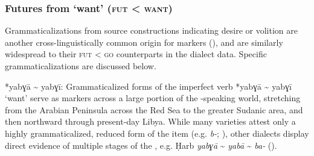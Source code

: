 \documentclass[output=paper]{langsci/langscibook}
\begin{document}
\subsubsection{Futures from ‘want’ (\textsc{fut} < \textsc{want})}

Grammaticalizations from source constructions indicating desire or volition are another cross-linguistically common origin for   markers (\citealt{Bybee1994,HeineKuteva2002}), and are similarly widespread to their \textsc{fut} < \textsc{go} counterparts in the  dialect data. Specific grammaticalizations are discussed below.

\begin{altdescription}
\item[*{yabɣā {\textasciitilde} yabɣī}:]
Grammaticalized forms of the imperfect verb *{yabɣā {\textasciitilde} yabɣī} ‘want’ serve as  markers across a large portion of the -speak\-ing world, stretching from the Arabian Peninsula across the Red Sea to the greater Sudanic area, and then northward through present-day Libya. While many  varieties attest only a highly grammaticalized, reduced form of the item (e.g.  \textit{b-}; \citealt{Qafisheh1977}), other dialects display direct evidence of multiple stages of the , e.g. Ḥarb \textit{yabɣā} {\textasciitilde} \textit{yabā} {\textasciitilde} \textit{ba-} (\citealt{Il-Hazmy1975}).


\end{altdescription}
\end{document}
